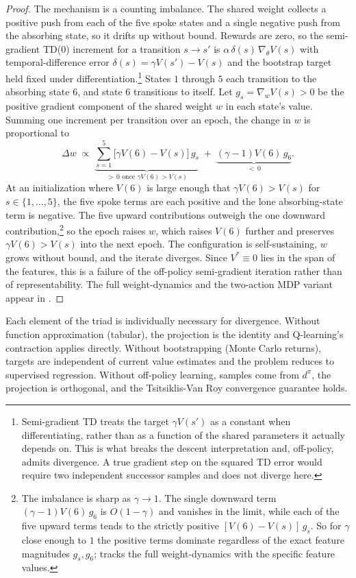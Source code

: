 \begin{proof}
The mechanism is a counting imbalance. The shared weight collects a positive push from each of the five spoke states and a single negative push from the absorbing state, so it drifts up without bound. Rewards are zero, so the semi-gradient TD(0) increment for a transition $s \to s'$ is $\alpha\, \delta(s)\, \nabla_\theta V(s)$ with temporal-difference error $\delta(s) = \gamma V(s') - V(s)$ and the bootstrap target held fixed under differentiation.\footnote{Semi-gradient TD treats the target $\gamma V(s')$ as a constant when differentiating, rather than as a function of the shared parameters it actually depends on. This is what breaks the descent interpretation and, off-policy, admits divergence. A true gradient step on the squared TD error would require two independent successor samples and does not diverge here.} States $1$ through $5$ each transition to the absorbing state $6$, and state $6$ transitions to itself. Let $g_s = \nabla_{w} V(s) > 0$ be the positive gradient component of the shared weight $w$ in each state's value. Summing one increment per transition over an epoch, the change in $w$ is proportional to
\[
\Delta w \;\propto\; \underbrace{\sum_{s=1}^{5} \big[\gamma V(6) - V(s)\big]\, g_s}_{>\,0 \text{ once } \gamma V(6) > V(s)} \;+\; \underbrace{(\gamma - 1) V(6)\, g_6}_{<\,0} .
\]
At an initialization where $V(6)$ is large enough that $\gamma V(6) > V(s)$ for $s \in \{1, \dots, 5\}$, the five spoke terms are each positive and the lone absorbing-state term is negative. The five upward contributions outweigh the one downward contribution,\footnote{The imbalance is sharp as $\gamma \to 1$. The single downward term $(\gamma-1) V(6)\, g_6$ is $O(1-\gamma)$ and vanishes in the limit, while each of the five upward terms tends to the strictly positive $[V(6) - V(s)]\, g_s$. So for $\gamma$ close enough to $1$ the positive terms dominate regardless of the exact feature magnitudes $g_s, g_6$; \citet{Baird1995} tracks the full weight-dynamics with the specific feature values.} so the epoch raises $w$, which raises $V(6)$ further and preserves $\gamma V(6) > V(s)$ into the next epoch. The configuration is self-sustaining, $w$ grows without bound, and the iterate diverges. Since $V^* \equiv 0$ lies in the span of the features, this is a failure of the off-policy semi-gradient iteration rather than of representability. The full weight-dynamics and the two-action MDP variant appear in \citet{Baird1995}.
\end{proof}

Each element of the triad is individually necessary for divergence. Without function approximation (tabular), the projection is the identity and Q-learning's contraction applies directly. Without bootstrapping (Monte Carlo returns), targets are independent of current value estimates and the problem reduces to supervised regression. Without off-policy learning, samples come from $d^\pi$, the projection is orthogonal, and the Tsitsiklis-Van Roy convergence guarantee holds.

